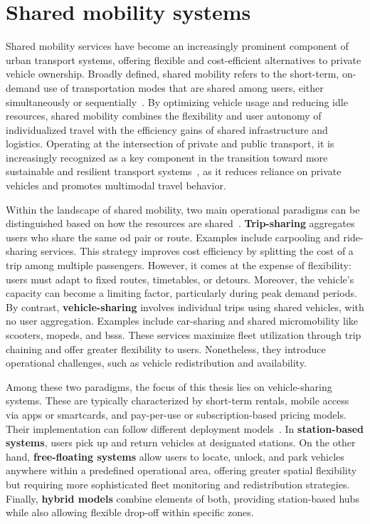\section{Shared mobility systems}
\label{sec:shared_mobility_systems}

Shared mobility services have become an increasingly prominent component of urban transport systems, offering flexible and cost-efficient alternatives to private vehicle ownership. Broadly defined, shared mobility refers to the short-term, on-demand use of transportation modes that are shared among users, either simultaneously or sequentially~\cite{Shaheen2015}. By optimizing vehicle usage and reducing idle resources, shared mobility combines the flexibility and user autonomy of individualized travel with the efficiency gains of shared infrastructure and logistics. Operating at the intersection of private and public transport, it is increasingly recognized as a key component in the transition toward more sustainable and resilient transport systems~\cite{UNFCCC_2022}, as it reduces reliance on private vehicles and promotes multimodal travel behavior.

Within the landscape of shared mobility, two main operational paradigms can be distinguished based on how the resources are shared~\cite{Shaheen2015, Santi2017}. \textbf{Trip-sharing} aggregates users who share the same \ac{od} pair or route. Examples include carpooling and ride-sharing services. This strategy improves cost efficiency by splitting the cost of a trip among multiple passengers. However, it comes at the expense of flexibility: users must adapt to fixed routes, timetables, or detours. Moreover, the vehicle's capacity can become a limiting factor, particularly during peak demand periods. By contrast, \textbf{vehicle-sharing} involves individual trips using shared vehicles, with no user aggregation. Examples include car-sharing and shared micromobility like scooters, mopeds, and \acp{bss}. These services maximize fleet utilization through trip chaining and offer greater flexibility to users. Nonetheless, they introduce operational challenges, such as vehicle redistribution and availability.

Among these two paradigms, the focus of this thesis lies on vehicle-sharing systems. These are typically characterized by short-term rentals, mobile access via apps or smartcards, and pay-per-use or subscription-based pricing models. Their implementation can follow different deployment models~\cite{Fu2025, NatureEVSharing2023}. In \textbf{station-based systems}, users pick up and return vehicles at designated stations. On the other hand, \textbf{free-floating systems} allow users to locate, unlock, and park vehicles anywhere within a predefined operational area, offering greater spatial flexibility but requiring more sophisticated fleet monitoring and redistribution strategies. Finally, \textbf{hybrid models} combine elements of both, providing station-based hubs while also allowing flexible drop-off within specific zones.

